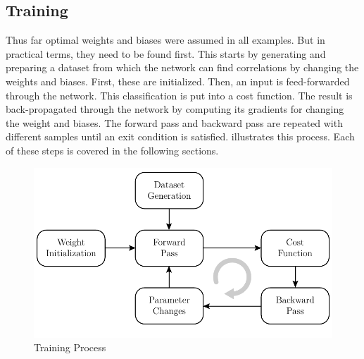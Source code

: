 \subsection{Training}
\label{sec:neural-networks-training}
Thus far optimal weights and biases were assumed in all examples.
But in practical terms, they need to be found first.
This starts by generating and preparing a dataset from which the network can find correlations by changing the weights and biases.
First, these are initialized.
Then, an input is feed-forwarded through the network.
This classification is put into a cost function.
The result is back-propagated through the network by computing its gradients for changing the weight and biases.
The forward pass and backward pass are repeated with different samples until an exit condition is satisfied.
 illustrates this process.
Each of these steps is covered in the following sections.
\begin{figure}
	\centering
	\includegraphics{images/training.pdf}
	\caption[Training Process]{Training Process}
	\label{fig:training}
\end{figure}





